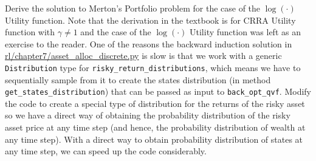 \documentclass[12pt]{exam}
\begin{document}
\begin{questions}
\question Derive the solution to Merton's Portfolio problem for the case of the $\log(\cdot)$ Utility function. Note that the derivation in the textbook is for CRRA Utility function with $\gamma \neq 1$ and the case of the $\log(\cdot)$ Utility function was left as an exercise to the reader.
 One of the reasons the backward induction solution in \href{https://github.com/TikhonJelvis/RL-book/blob/master/rl/chapter7/asset_alloc_discrete.py}{rl\//chapter7\//asset\_alloc\_discrete.py} is slow is that we work with a generic \lstinline{Distribution} type for \lstinline{risky_return_distributions}, which means we have to sequentially sample from it to create the states distribution (in method \lstinline{get_states_distribution}) that can be passed as input to \lstinline{back_opt_qvf}. Modify the code to create a special type of distribution for the returns of the risky asset so we have a direct way of obtaining the probability distribution of the risky asset price at any time step (and hence, the probability distribution of wealth at any time step). With a direct way to obtain probability distribution of states at any time step, we can speed up the code considerably. 



\end{questions}
\end{document}
